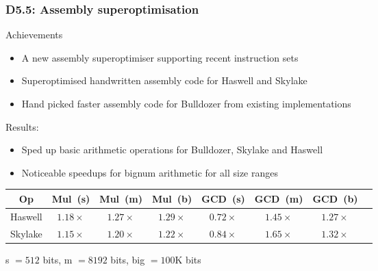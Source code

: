 \documentclass{beamer}
\begin{document}
\begin{frame}

\frametitle{D5.5: Assembly superoptimisation}

\begin{block} {Achievements}
\begin{itemize}
\item A new assembly superoptimiser supporting recent instruction sets%
\item Superoptimised handwritten assembly code for Haswell and Skylake
\item Hand picked faster assembly code for Bulldozer from existing implementations
\end{itemize}
\end{block}
\begin{block}
  {Results:}
\begin{itemize}
\item Sped up basic arithmetic operations for Bulldozer, Skylake and Haswell
\item Noticeable speedups for bignum arithmetic for all size ranges
\end{itemize}
\end{block}


  \begin{tabular}{cccccccc}
  \toprule
{Op} & \mbox{Mul (s)} & \mbox{Mul (m)} & \mbox{Mul (b)} & \mbox{GCD (s)} & \mbox{GCD (m)} & \mbox{GCD (b)} \\
\midrule
{Haswell} & $1.18\times$ & $1.27\times$ & $1.29\times$ & $0.72\times$ & $1.45\times$ & $1.27\times$\\
{Skylake} & $1.15\times$ & $1.20\times$ & $1.22\times$ & $0.84\times$ & $1.65\times$ & $1.32\times$ \\
\bottomrule
\end{tabular}

s $= 512$ bits, m $= 8192$ bits, big $= 100$K bits

\end{frame}



\end{document}

